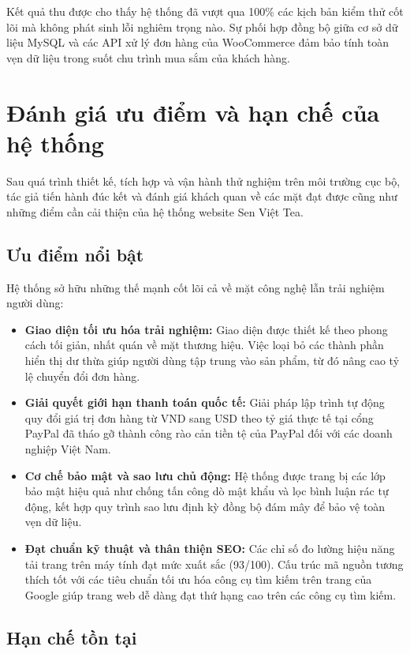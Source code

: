 Kết quả thu được cho thấy hệ thống đã vượt qua 100\% các kịch bản kiểm thử cốt lõi mà không phát sinh lỗi nghiêm trọng nào. Sự phối hợp đồng bộ giữa cơ sở dữ liệu MySQL và các API xử lý đơn hàng của WooCommerce đảm bảo tính toàn vẹn dữ liệu trong suốt chu trình mua sắm của khách hàng.

\section{Đánh giá ưu điểm và hạn chế của hệ thống}

Sau quá trình thiết kế, tích hợp và vận hành thử nghiệm trên môi trường cục bộ, tác giả tiến hành đúc kết và đánh giá khách quan về các mặt đạt được cũng như những điểm cần cải thiện của hệ thống website Sen Việt Tea.

\subsection{Ưu điểm nổi bật}

Hệ thống sở hữu những thế mạnh cốt lõi cả về mặt công nghệ lẫn trải nghiệm người dùng:
\begin{itemize}
    \item \textbf{Giao diện tối ưu hóa trải nghiệm:} Giao diện được thiết kế theo phong cách tối giản, nhất quán về mặt thương hiệu. Việc loại bỏ các thành phần hiển thị dư thừa giúp người dùng tập trung vào sản phẩm, từ đó nâng cao tỷ lệ chuyển đổi đơn hàng.
    \item \textbf{Giải quyết giới hạn thanh toán quốc tế:} Giải pháp lập trình tự động quy đổi giá trị đơn hàng từ VND sang USD theo tỷ giá thực tế tại cổng PayPal đã tháo gỡ thành công rào cản tiền tệ của PayPal đối với các doanh nghiệp Việt Nam.
    \item \textbf{Cơ chế bảo mật và sao lưu chủ động:} Hệ thống được trang bị các lớp bảo mật hiệu quả như chống tấn công dò mật khẩu và lọc bình luận rác tự động, kết hợp quy trình sao lưu định kỳ đồng bộ đám mây để bảo vệ toàn vẹn dữ liệu.
    \item \textbf{Đạt chuẩn kỹ thuật và thân thiện SEO:} Các chỉ số đo lường hiệu năng tải trang trên máy tính đạt mức xuất sắc (93/100). Cấu trúc mã nguồn tương thích tốt với các tiêu chuẩn tối ưu hóa công cụ tìm kiếm trên trang của Google giúp trang web dễ dàng đạt thứ hạng cao trên các công cụ tìm kiếm.
\end{itemize}

\subsection{Hạn chế tồn tại}

